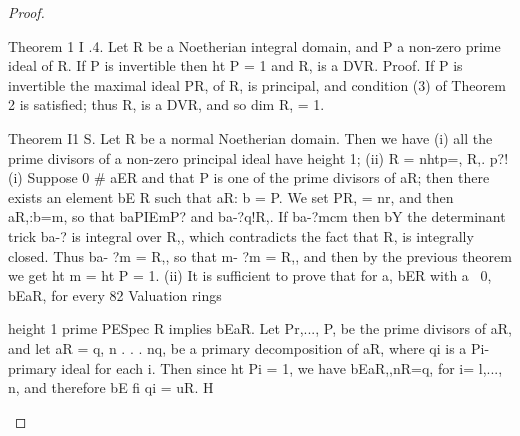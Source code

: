 \begin{proof}
\begin{mathematicalrecord}
Theorem 1 I .4. Let R be a Noetherian integral domain, and P a non-zero
prime ideal of R. If P is invertible then ht P = 1 and R, is a DVR.
Proof. If P is invertible the maximal ideal PR, of R, is principal, and
condition (3) of Theorem 2 is satisfied; thus R, is a DVR, and so dim R, = 1.

 Theorem I1 S. Let R be a normal Noetherian domain. Then we have
   (i) all the prime divisors of a non-zero principal ideal have height 1;
   (ii) R = nhtp=, R,.
p?!       (i) Suppose 0 # aER and that P is one of the prime divisors of aR;
then there exists an element bE R such that aR: b = P. We set PR, = nr, and
then aR,:b=m,           so that baPIEmP?   and ba-?q!R,.  If ba-?mcm    then
bY the determinant trick ba-? is integral over R,, which contradicts the
fact that R, is integrally closed. Thus ba- ?m = R,, so that m- ?m = R,, and
then by the previous theorem we get ht m = ht P = 1.
   (ii) It is sufficient to prove that for a, bER with a ~0, bEaR, for every
82       Valuation rings

height 1 prime PESpec R implies bEaR. Let Pr,..., P, be the prime
divisors of aR, and let aR = q, n . . . nq, be a primary decomposition of
aR, where qi is a Pi-primary ideal for each i. Then since ht Pi = 1, we have
bEaR,,nR=q,      for i= l,..., n, and therefore bE fi qi = uR. H
\end{mathematicalrecord}
\end{proof}


